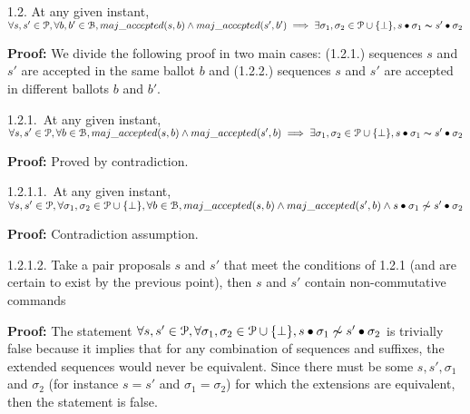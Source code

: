 \indent\indent\indent\parbox{\linewidth-\algorithmicindent*3}{\strut1.2. At any given instant, $\forall s,s' \in \mathcal{P},\forall b,b' \in \mathcal{B}, maj\_accepted(s,b) \land maj\_accepted(s',b') \implies \exists \sigma_1,\sigma_2 \in \mathcal{P} \cup \{\bot\}, s \bullet \sigma_1 \thicksim s' \bullet \sigma_2$}\par
\indent\indent\indent\indent\parbox{\linewidth-\algorithmicindent*4}{\strut\textbf{Proof:} We divide the following proof in two main cases: (1.2.1.) sequences $s$ and $s'$ are accepted in the same ballot $b$ and (1.2.2.) sequences $s$ and $s'$ are accepted in different ballots $b$ and $b'$.}\par
\indent\indent\indent\indent\indent\parbox{\linewidth-\algorithmicindent*5}{\strut1.2.1.~At any given instant, $\forall s,s' \in \mathcal{P},\forall b \in \mathcal{B}, maj\_accepted(s,b) \land maj\_accepted(s',b) \implies \exists \sigma_1,\sigma_2 \in \mathcal{P} \cup \{\bot\}, s \bullet \sigma_1 \thicksim s' \bullet \sigma_2$} \par
\indent\indent\indent\indent\indent\indent\parbox{\linewidth}{\strut\textbf{Proof:} Proved by contradiction.}\par
\indent\indent\indent\indent\indent\indent\indent\parbox{\linewidth-\algorithmicindent*5}{\strut1.2.1.1.~At any given instant, $\forall s,s' \in \mathcal{P}, \forall \sigma_1,\sigma_2 \in \mathcal{P} \cup \{\bot \},\forall b \in \mathcal{B}, maj\_accepted(s,b) \land maj\_accepted(s',b) \wedge s \bullet \sigma_1 \not\thicksim s' \bullet \sigma_2$} \par
\indent\indent\indent\indent\indent\indent\indent\indent\parbox{\linewidth}{\strut\textbf{Proof:} Contradiction assumption.}\par
\indent\indent\indent\indent\indent\indent\indent\parbox{\linewidth-\algorithmicindent*5}{\strut1.2.1.2. Take a pair proposals $s$ and $s'$ that meet the conditions of 1.2.1 (and are certain to exist by the previous point), then $s$ and $s'$ contain non-commutative commands}\par
\indent\indent\indent\indent\indent\indent\indent\indent\parbox{\linewidth-\algorithmicindent*6}{\strut\textbf{Proof:} The statement $\forall s,s' \in \mathcal{P}, \forall \sigma_1,\sigma_2 \in \mathcal{P} \cup \{\bot \}, s \bullet \sigma_1 \not\thicksim s' \bullet \sigma_2$ is trivially false because it implies that for any combination of sequences and suffixes, the extended sequences would never be equivalent. Since there must be some $s,s',\sigma_1$ and $\sigma_2$ (for instance $s=s'$ and $\sigma_1=\sigma_2$) for which the extensions are equivalent, then the statement is false.}\par
